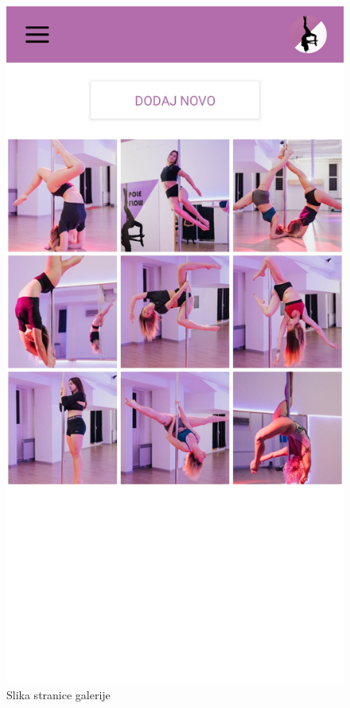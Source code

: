 \documentclass[times, utf8, zavrsni]{fer}
\begin{document}
			\begin{figure}[H]
        			\includegraphics[scale=0.2]{slike/App_galerija.jpg}
        			\centering
        			\caption{Slika stranice galerije}
        			\label{fig:promjene}
        		\end{figure}
			    
\end{document}
